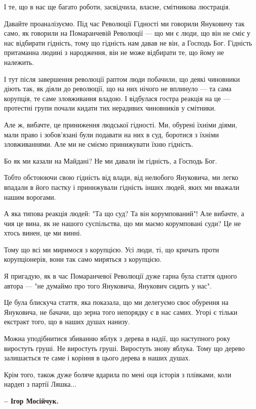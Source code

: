 І те, що в нас ще багато роботи, засвідчила, власне, смітникова люстрація. 

Давайте проаналізуємо. Під час Революції Гідності ми говорили Януковичу так
само, як говорили на Помаранчевій Революції --- що ми є люди, що він не сміє у
нас відбирати гідність, тому що гідність нам давав не він, а Господь Бог.
Гідність притаманна людині з народження, він не може відбирати те, що йому не
належить. 

І тут після завершення революції раптом люди побачили, що деякі чиновники діють
так, як діяли до революції, що на них нічого не вплинуло --- та сама корупція, те
саме зловживання владою. І відбулася гостра реакція на це --- протестні групи
почали кидати тих нерадивих чиновників у смітники. 

Але ж, вибачте, це приниження людської гідності. Ми, обурені їхніми діями, мали
право і зобов’язані були подавати на них в суд, боротися з їхніми
зловживаннями. Але ми не сміємо принижувати їхню гідність. 

Бо як ми казали на Майдані? Не ми давали їм гідність, а Господь Бог. 

Тобто обстоюючи свою гідність від влади, від нелюбого Януковича, ми легко
впадали в його пастку і принижували гідність інших людей, яких ми вважали нашим
ворогами.

А яка типова реакція людей: "Та що суд? Та він корумпований"! Але вибачте, а
чия це вина, як не нашого суспільства, що ми маємо корумповані суди? Це не
хтось винен, це ми винні. 

Тому що всі ми миримося з корупцією. Усі люди, ті, що кричать проти
корупціонерів, вони так само миряться з корупцією. 

Я пригадую, як в час Помаранчевої Революції дуже гарна була стаття одного
автора --- "не думаймо про того Януковича, Янукович сидить у нас". 

Це була блискуча стаття, яка показала, що ми делегуємо своє обурення на
Януковича, не бачачи, що зерна того непорядку є в нас самих. Угорі є тільки
екстракт того, що в наших душах нанизу.  

Можна уподібнитися збиванню яблук з дерева в надії, що наступного року
виростуть груші. Не виростуть груші. Виростуть знову яблука. Тому що дерево
залишається те саме і коріння в цього дерева в наших душах.

Крім того, також дуже боляче вдарила по мені оця історія з плівками, коли
нардеп з партії Ляшка...

\textbf{– Ігор Мосійчук.}

